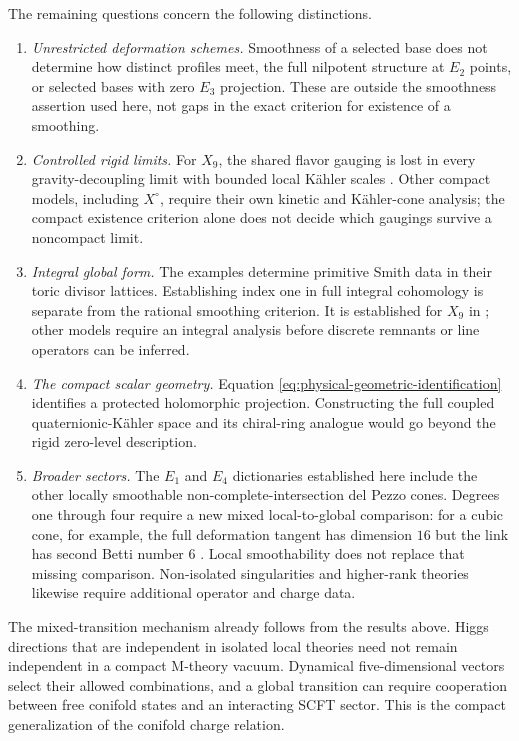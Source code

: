 The remaining questions concern the following distinctions.

\begin{enumerate}
 \item \emph{Unrestricted deformation schemes.} Smoothness of a selected
 base does not determine how distinct profiles meet, the full nilpotent
 structure at $E_2$ points, or selected bases with zero $E_3$ projection.
 These are outside the smoothness assertion used here, not gaps in the
 exact criterion for existence of a smoothing.

 \item \emph{Controlled rigid limits.} For $X_9$, the shared flavor gauging
 is lost in every gravity-decoupling limit with bounded local K\"ahler
 scales \cite[Section~4]{Wuebben:2026quantum}. Other compact models,
 including $X^{\circ}$, require their own kinetic and K\"ahler-cone
 analysis; the compact existence criterion alone does not decide which
 gaugings survive a noncompact limit.

 \item \emph{Integral global form.} The examples determine primitive Smith
 data in their toric divisor lattices. Establishing index one in full integral
 cohomology is separate from the rational smoothing criterion. It is
 established for $X_9$ in \cite[Section~3 and Appendix~B]{Wuebben:2026quantum};
 other models require an integral analysis before discrete remnants or
 line operators can be inferred.

 \item \emph{The compact scalar geometry.} Equation
 \eqref{eq:physical-geometric-identification} identifies a protected
 holomorphic projection. Constructing the full coupled
 quaternionic-K\"ahler space and its chiral-ring analogue would go beyond the
 rigid zero-level description.

 \item \emph{Broader sectors.} The $E_1$ and $E_4$ dictionaries established
 here include the other locally smoothable non-complete-intersection
 del Pezzo cones. Degrees one through four require a new mixed
 local-to-global comparison: for a cubic cone, for example, the full
 deformation tangent has dimension $16$ but the link has second Betti
 number $6$ \cite[Section~1.2]{Wuebben:2026smoothing}. Local smoothability
 does not replace that missing comparison. Non-isolated singularities
 and higher-rank theories likewise require additional operator and charge data.
\end{enumerate}

The mixed-transition mechanism already follows from the results above. Higgs
directions that are independent in isolated local theories need not remain
independent in a compact M-theory vacuum. Dynamical five-dimensional vectors
select their allowed combinations, and a global transition can require
cooperation between free conifold states and an interacting SCFT sector. This
is the compact generalization of the conifold charge relation.
